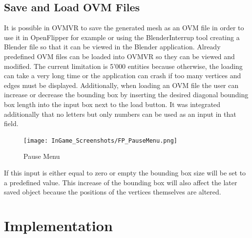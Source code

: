 \documentclass{report}
\begin{document}
	\section{Save and Load OVM Files}
	\startsection
		It is possible in OVMVR to save the generated mesh as an OVM file in order to use it in OpenFlipper for example or using the BlenderInterrup tool creating a Blender file so that it can be viewed in the Blender application. Already predefined OVM files can be loaded into OVMVR so they can be viewed and modified. The current limitation is 5'000 entities because otherwise, the loading can take a very long time or the application can crash if too many vertices and edges must be displayed. Additionally, when loading an OVM file the user can increase or decrease the bounding box by inserting the desired diagonal bounding box length into the input box next to the load button. It was integrated additionally that no letters but only numbers can be used as an input in that field.
		\begin{figure}[H]
			\begin{center}
				\texttt{[image: InGame\_Screenshots/FP\_PauseMenu.png]}
				\caption{Pause Menu}
			\end{center}
		\end{figure}
		\noindent If this input is either equal to zero or empty the bounding box size will be set to a predefined value. This increase of the bounding box will also affect the later saved object because the positions of the vertices themselves are altered.
	\closesection
	
	
\chapter{Implementation}
\end{document}
